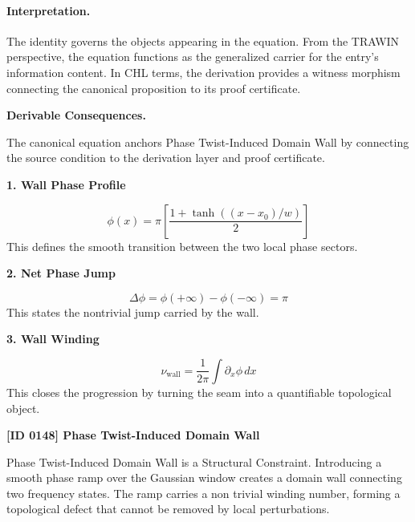 \paragraph{Interpretation.}
The identity governs the objects appearing in the equation. From the TRAWIN perspective, the equation functions as the generalized carrier for the entry’s information content. In CHL terms, the derivation provides a witness morphism connecting the canonical proposition to its proof certificate.

\par\vspace{0.35em}
\noindent\textbf{Derivable Consequences.}\quad
\begingroup
\footnotesize
\raggedright
The canonical equation anchors Phase Twist-Induced Domain Wall by connecting the source condition to the derivation layer and proof certificate.
\par\endgroup

\noindent\textbf{1. Wall Phase Profile}\par
\[
\phi(x)=\pi\left[\frac{1+\tanh((x-x_0)/w)}{2}\right]
\]
\noindent This defines the smooth transition between the two local phase sectors.\par
\noindent\textbf{2. Net Phase Jump}\par
\[
\Delta\phi = \phi(+\infty)-\phi(-\infty)=\pi
\]
\noindent This states the nontrivial jump carried by the wall.\par
\noindent\textbf{3. Wall Winding}\par
\[
\nu_{\mathrm{wall}}=\frac{1}{2\pi}\int \partial_x\phi\,dx
\]
\noindent This closes the progression by turning the seam into a quantifiable topological object.\par

\clearpage
\noindent\textbf{[ID 0148] Phase Twist-Induced Domain Wall}\par
\vspace{0.35em}
\begingroup\small
{}
Phase Twist-Induced Domain Wall is a Structural Constraint. Introducing a smooth phase ramp over the Gaussian window creates a domain wall connecting two frequency states. The ramp carries a non trivial winding number, forming a topological defect that cannot be removed by local perturbations.

